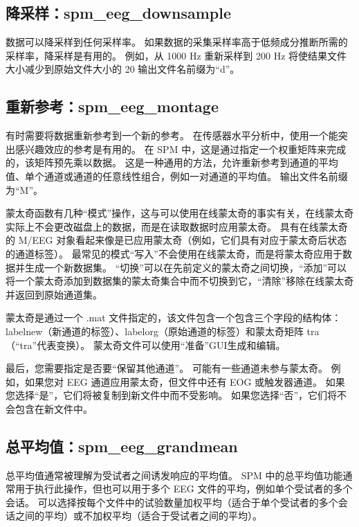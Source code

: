 \subsection{降采样：spm\_eeg\_downsample}

数据可以降采样到任何采样率。
如果数据的采集采样率高于低频成分推断所需的采样率，降采样是有用的。
例如，从 1000 Hz 重新采样到 200 Hz 将使结果文件大小减少到原始文件大小的 20%
输出文件名前缀为“d”。


\subsection{重新参考：spm\_eeg\_montage}

有时需要将数据重新参考到一个新的参考。
在传感器水平分析中，使用一个能突出感兴趣效应的参考是有用的。
在 SPM 中，这是通过指定一个权重矩阵来完成的，该矩阵预先乘以数据。
这是一种通用的方法，允许重新参考到通道的平均值、单个通道或通道的任意线性组合，例如一对通道的平均值。
输出文件名前缀为“M”。

蒙太奇函数有几种“模式”操作，这与可以使用在线蒙太奇的事实有关，在线蒙太奇实际上不会更改磁盘上的数据，而是在读取数据时应用蒙太奇。
具有在线蒙太奇的 M/EEG 对象看起来像是已应用蒙太奇（例如，它们具有对应于蒙太奇后状态的通道标签）。
最常见的模式“写入”不会使用在线蒙太奇，而是将蒙太奇应用于数据并生成一个新数据集。
“切换”可以在先前定义的蒙太奇之间切换，“添加”可以将一个蒙太奇添加到数据集的蒙太奇集合中而不切换到它，“清除”移除在线蒙太奇并返回到原始通道集。

蒙太奇是通过一个 .mat 文件指定的，该文件包含一个包含三个字段的结构体：labelnew（新通道的标签）、labelorg（原始通道的标签）和蒙太奇矩阵 tra（“tra”代表变换）。
蒙太奇文件可以使用“准备”GUI生成和编辑。

最后，您需要指定是否要“保留其他通道”。
可能有一些通道未参与蒙太奇。
例如，如果您对 EEG 通道应用蒙太奇，但文件中还有 EOG 或触发器通道。
如果您选择“是”，它们将被复制到新文件中而不受影响。
如果您选择“否”，它们将不会包含在新文件中。


\subsection{总平均值：spm\_eeg\_grandmean}

总平均值通常被理解为受试者之间诱发响应的平均值。
SPM 中的总平均值功能通常用于执行此操作，但也可以用于多个 EEG 文件的平均，例如单个受试者的多个会话。
可以选择按每个文件中的试验数量加权平均（适合于单个受试者的多个会话之间的平均）或不加权平均（适合于受试者之间的平均）。

